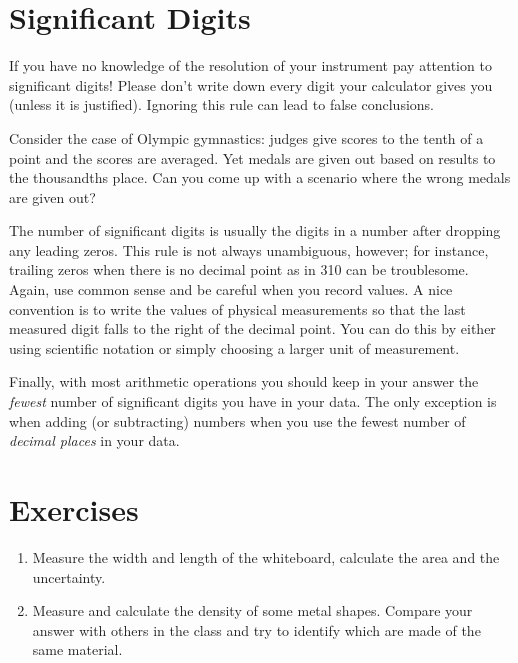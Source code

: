 \section{Significant Digits}

If you have no knowledge of the resolution of your instrument pay attention to significant
digits!  Please don't write down every digit your calculator gives you (unless
it is justified).  Ignoring this rule can lead to false conclusions.

Consider the case of Olympic gymnastics: judges give scores to the tenth of a
point and the scores are averaged.  Yet medals are given out based on results to
the thousandths place.  Can you come up with a scenario where the wrong medals
are given out?

The number of significant digits is usually the digits in a number after
dropping any leading zeros.  This rule is not always unambiguous, however; for
instance, trailing zeros when there is no decimal point as in 310 can be
troublesome.  Again, use common sense and be careful when you record values.  A
nice convention is to write the values of physical measurements so that the last
measured digit falls to the right of the decimal point.  You can do this by
either using scientific notation or simply choosing a larger unit of
measurement.

Finally, with most arithmetic operations you should keep in your answer the {\em
  fewest} number of significant digits you have in your data.  The only
exception is when adding (or subtracting) numbers when you use the fewest number
of {\em decimal places} in your data.

\section{Exercises}

\begin{enumerate}
\item Measure the width and length of the whiteboard, calculate the area and the
  uncertainty.
  
\item Measure and calculate the density of some metal shapes.  Compare your
  answer with others in the class and try to identify which are made of the same
  material. 

\end{enumerate}
